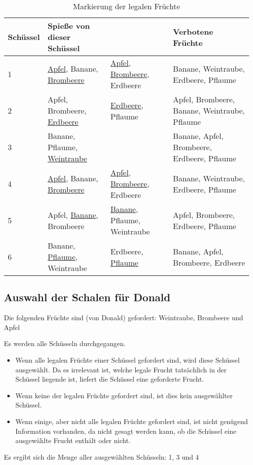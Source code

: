 \documentclass[a4paper,10pt,ngerman]{scrartcl}
\begin{document}
\begin{table}[ht]
    \begin{center}
        \begin{tabularx}{\linewidth}{l|X|X|X}
            \textbf{Schüssel} & \textbf{Spieße von dieser Schüssel}              &                                                    & \textbf{Verbotene Früchte}                    \\
            \hline
            1                 & \underline{Apfel}, Banane, \underline{Brombeere} & \underline{Apfel}, \underline{Brombeere}, Erdbeere & Banane, Weintraube, Erdbeere, Pflaume         \\
            \hline
            2                 & Apfel, Brombeere, \underline{Erdbeere}           & \underline{Erdbeere}, Pflaume                      & Apfel, Brombeere, Banane, Weintraube, Pflaume \\
            \hline
            3                 & Banane, Pflaume, \underline{Weintraube}          &                                                    & Banane, Apfel, Brombeere, Erdbeere, Pflaume   \\
            \hline
            4                 & \underline{Apfel}, Banane, \underline{Brombeere} & \underline{Apfel}, \underline{Brombeere}, Erdbeere & Banane, Weintraube, Erdbeere, Pflaume         \\
            \hline
            5                 & Apfel, \underline{Banane}, Brombeere             & \underline{Banane}, Pflaume, Weintraube            & Apfel, Brombeere, Erdbeere, Pflaume           \\
            \hline
            6                 & Banane, \underline{Pflaume}, Weintraube          & Erdbeere, \underline{Pflaume}                      & Banane, Apfel, Brombeere, Erdbeere
        \end{tabularx}
        \caption{Markierung der legalen Früchte}
        \label{tab:alle_Schüsseln_legal}
    \end{center}
\end{table}


\subsection{Auswahl der Schalen für Donald}
Die folgenden Früchte sind (von Donald) gefordert: Weintraube, Brombeere und Apfel

Es werden alle Schüsseln durchgegangen.
\begin{itemize}
    \item Wenn alle legalen Früchte einer Schüssel gefordert sind, wird diese Schüssel ausgewählt.
          Da es irrelevant ist, welche legale Frucht tatsächlich in der Schüssel liegende ist, liefert die Schüssel eine geforderte Frucht.
    \item Wenn keine der legalen Früchte gefordert sind, ist dies kein ausgewählter Schüssel.
    \item Wenn einige, aber nicht alle legalen Früchte gefordert sind, ist nicht genügend Information vorhanden, da nicht gesagt werden kann, ob die Schüssel eine ausgewählte Frucht enthält oder nicht.
\end{itemize}
Es ergibt sich die Menge aller ausgewählten Schüsseln: 1, 3 und 4
\end{document}
